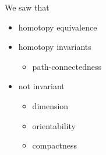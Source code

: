 \begin{prev}
	We saw that
	\begin{itemize}
		\item homotopy equivalence
		\item homotopy invariants
		      \begin{itemize}
			      \item path-connectedness
		      \end{itemize}
		\item not invariant
		      \begin{itemize}
			      \item dimension
			      \item orientability
			      \item compactness
		      \end{itemize}
	\end{itemize}
\end{prev}

